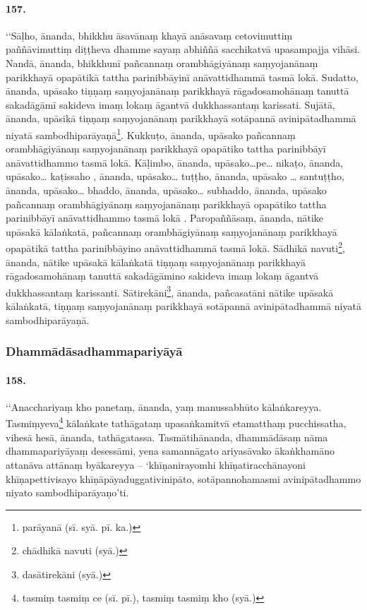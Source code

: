 \paragraph{157.} ‘‘Sāḷho, ānanda, bhikkhu āsavānaṃ khayā anāsavaṃ cetovimuttiṃ paññāvimuttiṃ diṭṭheva dhamme sayaṃ abhiññā sacchikatvā upasampajja vihāsi. Nandā, ānanda, bhikkhunī pañcannaṃ orambhāgiyānaṃ saṃyojanānaṃ parikkhayā opapātikā tattha parinibbāyinī anāvattidhammā tasmā lokā. Sudatto, ānanda, upāsako tiṇṇaṃ saṃyojanānaṃ parikkhayā rāgadosamohānaṃ tanuttā sakadāgāmī sakideva imaṃ lokaṃ āgantvā dukkhassantaṃ karissati. Sujātā, ānanda, upāsikā tiṇṇaṃ saṃyojanānaṃ parikkhayā sotāpannā avinipātadhammā niyatā sambodhiparāyaṇā\footnote{parāyanā (sī. syā. pī. ka.)}. Kukkuṭo, ānanda, upāsako pañcannaṃ orambhāgiyānaṃ saṃyojanānaṃ parikkhayā opapātiko tattha parinibbāyī anāvattidhammo tasmā lokā. Kāḷimbo, ānanda, upāsako…pe… nikaṭo, ānanda, upāsako… kaṭissaho , ānanda, upāsako… tuṭṭho, ānanda, upāsako … santuṭṭho, ānanda, upāsako… bhaddo, ānanda, upāsako… subhaddo, ānanda, upāsako pañcannaṃ orambhāgiyānaṃ saṃyojanānaṃ parikkhayā opapātiko tattha parinibbāyī anāvattidhammo tasmā lokā . Paropaññāsaṃ, ānanda, nātike upāsakā kālaṅkatā, pañcannaṃ orambhāgiyānaṃ saṃyojanānaṃ parikkhayā opapātikā tattha parinibbāyino anāvattidhammā tasmā lokā. Sādhikā navuti\footnote{chādhikā navuti (syā.)}, ānanda, nātike upāsakā kālaṅkatā tiṇṇaṃ saṃyojanānaṃ parikkhayā rāgadosamohānaṃ tanuttā sakadāgāmino sakideva imaṃ lokaṃ āgantvā dukkhassantaṃ karissanti. Sātirekāni\footnote{dasātirekāni (syā.)}, ānanda, pañcasatāni nātike upāsakā kālaṅkatā, tiṇṇaṃ saṃyojanānaṃ parikkhayā sotāpannā avinipātadhammā niyatā sambodhiparāyaṇā.

\subsubsection{Dhammādāsadhammapariyāyā}

\paragraph{158.} ‘‘Anacchariyaṃ kho panetaṃ, ānanda, yaṃ manussabhūto kālaṅkareyya. Tasmiṃyeva\footnote{tasmiṃ tasmiṃ ce (sī. pī.), tasmiṃ tasmiṃ kho (syā.)} kālaṅkate tathāgataṃ upasaṅkamitvā etamatthaṃ pucchissatha, vihesā hesā, ānanda, tathāgatassa. Tasmātihānanda, dhammādāsaṃ nāma dhammapariyāyaṃ desessāmi, yena samannāgato ariyasāvako ākaṅkhamāno attanāva attānaṃ byākareyya – ‘khīṇanirayomhi khīṇatiracchānayoni khīṇapettivisayo khīṇāpāyaduggativinipāto, sotāpannohamasmi avinipātadhammo niyato sambodhiparāyaṇo’ti.

